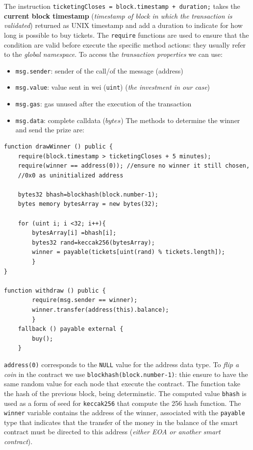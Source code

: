 \documentclass[10pt,a4paper]{report}
\begin{document}
		The instruction \texttt{ticketingCloses = block.timestamp + duration;} takes the \textbf{current block timestamp} (\textit{timestamp of block in which the transaction is validated}) returned as UNIX timestamp and add a duration to indicate for how long is possible to buy tickets.
		The \texttt{require} functions are used to ensure that the condition are valid before execute the specific method actions: they usually refer to the \textit{global namespace}.
		To access the \textit{transaction properties} we can use:
		\begin{itemize}
			\item 
			\texttt{msg.sender}: sender of the call/of the message (address)
			\item 
			\texttt{msg.value}: value sent in wei (\texttt{uint}) (\textit{the investment in our case})
			\item 
			\texttt{msg.gas}: gas unused after the execution of the transaction
			\item 
			\texttt{msg.data}:  complete calldata ($bytes$)
			The methods to determine the winner and send the prize are:
		\end{itemize}
\begin{lstlisting}
function drawWinner () public { 
	require(block.timestamp > ticketingCloses + 5 minutes); 
	require(winner == address(0)); //ensure no winner it still chosen, 
	//0x0 as uninitialized address
				
	bytes32 bhash=blockhash(block.number-1); 
	bytes memory bytesArray = new bytes(32); 
				
	for (uint i; i <32; i++){
		bytesArray[i] =bhash[i];
		bytes32 rand=keccak256(bytesArray);
		winner = payable(tickets[uint(rand) % tickets.length]);
		}
}

function withdraw () public { 
		require(msg.sender == winner);
		winner.transfer(address(this).balance);
		} 
	fallback () payable external { 
		buy(); 
	} 

\end{lstlisting}
	
	\texttt{address(0)} corresponds to the \texttt{NULL} value for the address data type.
	To \textit{flip a coin} in the contract we use \texttt{blockhash(block.number-1)}: thie ensure to have the same random value for each node that execute the contract. The function take the hash of the previous block, being determinstic. The computed value \texttt{bhash} is used as a form of seed for \texttt{keccak256} that compute the 256 hash function.
	The  \texttt{winner} variable contains the address of the winner, associated with the \texttt{payable} type that indicates that the transfer of the money in the balance of the smart contract must be directed to this address (\textit{either EOA or another smart contract}).
	
\end{document}

